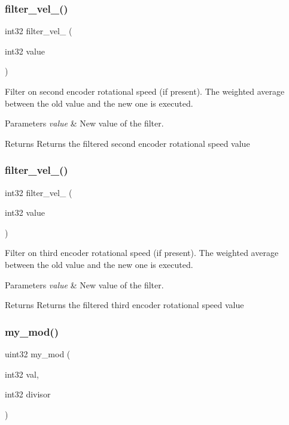 \subsubsection{filter\+\_\+vel\+\_()}
{\footnotesize\ttfamily int32 filter\+\_\+vel\+\_ (\begin{DoxyParamCaption}\item[{int32}]{value }\end{DoxyParamCaption})}

Filter on second encoder rotational speed (if present). The weighted average between the old value and the new one is executed.


\begin{DoxyParams}{Parameters}
{\em value} & New value of the filter.\\
\hline
\end{DoxyParams}
\begin{DoxyReturn}{Returns}
Returns the filtered second encoder rotational speed value 
\end{DoxyReturn}
\mbox{\label{utils_8h_a70430ee90ed28e4c9fca0c4ca3d6583e}} 
\subsubsection{filter\+\_\+vel\+\_()}
{\footnotesize\ttfamily int32 filter\+\_\+vel\+\_ (\begin{DoxyParamCaption}\item[{int32}]{value }\end{DoxyParamCaption})}

Filter on third encoder rotational speed (if present). The weighted average between the old value and the new one is executed.


\begin{DoxyParams}{Parameters}
{\em value} & New value of the filter.\\
\hline
\end{DoxyParams}
\begin{DoxyReturn}{Returns}
Returns the filtered third encoder rotational speed value 
\end{DoxyReturn}
\mbox{\label{utils_8h_a01d3bb6c1fd469a6c530fb296e4fe0fe}} 
\subsubsection{my\+\_\+mod()}
{\footnotesize\ttfamily uint32 my\+\_\+mod (\begin{DoxyParamCaption}\item[{int32}]{val,  }\item[{int32}]{divisor }\end{DoxyParamCaption})}


